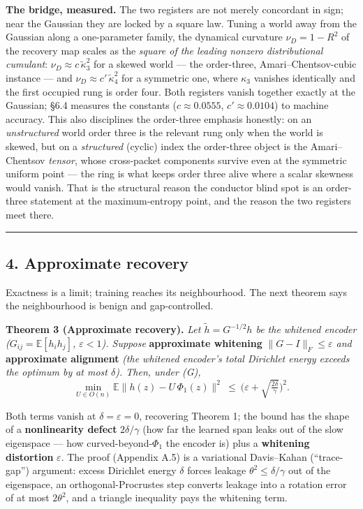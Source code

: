 \documentclass[
  letterpaper,
  11pt]{article}
\theoremstyle{plain}
\theoremstyle{definition}
\theoremstyle{remark}
\begin{document}
\textbf{The bridge, measured.} The two registers are not merely concordant in sign; near the Gaussian they are locked by a square law. Tuning a world away from the Gaussian along a one-parameter family, the dynamical curvature \(\nu_D = 1-R^2\) of the recovery map scales as the \emph{square of the leading nonzero distributional cumulant}: \(\nu_D \approx c\,\tilde\kappa_3^2\) for a skewed world --- the order-three, Amari--Chentsov-cubic instance --- and \(\nu_D \approx c'\,\tilde\kappa_4^2\) for a symmetric one, where \(\kappa_3\) vanishes identically and the first occupied rung is order four. Both registers vanish together exactly at the Gaussian; §6.4 measures the constants (\(c\approx 0.0555\), \(c'\approx 0.0104\)) to machine accuracy. This also disciplines the order-three emphasis honestly: on an \emph{unstructured} world order three is the relevant rung only when the world is skewed, but on a \emph{structured} (cyclic) index the order-three object is the Amari--Chentsov \emph{tensor}, whose cross-packet components survive even at the symmetric uniform point --- the ring is what keeps order three alive where a scalar skewness would vanish. That is the structural reason the conductor blind spot is an order-three statement at the maximum-entropy point, and the reason the two registers meet there.

\begin{center}\rule{0.5\linewidth}{0.5pt}\end{center}

\subsection{4. Approximate recovery}\label{sec:approx}

Exactness is a limit; training reaches its neighbourhood. The next theorem says the neighbourhood is benign and gap-controlled.

\textbf{Theorem 3 (Approximate recovery).} \emph{Let \(\tilde h = G^{-1/2}h\) be the whitened encoder (\(G_{ij}=\mathbb E[h_ih_j]\), \(\varepsilon<1\)). Suppose} \textbf{approximate whitening} \emph{\(\|G-I\|_F\le\varepsilon\) and} \textbf{approximate alignment} \emph{(the whitened encoder's total Dirichlet energy exceeds the optimum by at most \(\delta\)). Then, under (G),}
\[\min_{U\in O(n)} \mathbb E\big\|h(z)-U\,\Phi_1(z)\big\|^2 \ \le\ \Big(\varepsilon+\sqrt{\tfrac{2\delta}{\gamma}}\Big)^2.\]

Both terms vanish at \(\delta=\varepsilon=0\), recovering Theorem 1; the bound has the shape of a \textbf{nonlinearity defect} \(2\delta/\gamma\) (how far the learned span leaks out of the slow eigenspace --- how curved-beyond-\(\Phi_1\) the encoder is) plus a \textbf{whitening distortion} \(\varepsilon\). The proof (Appendix A.5) is a variational Davis--Kahan (``trace-gap'') argument: excess Dirichlet energy \(\delta\) forces leakage \(\theta^2\le\delta/\gamma\) out of the eigenspace, an orthogonal-Procrustes step converts leakage into a rotation error of at most \(2\theta^2\), and a triangle inequality pays the whitening term.
\end{document}
